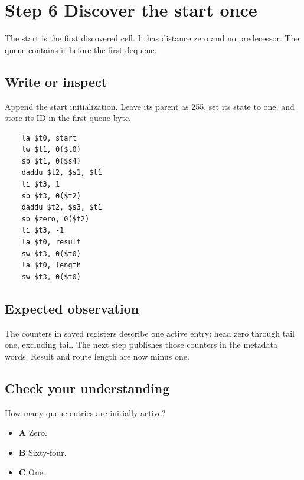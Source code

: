 \section{Step 6 Discover the start once}\label{maze-s06}

The start is the first discovered cell. It has distance zero and no predecessor. The queue contains it before the first dequeue.

\subsection{Write or inspect}

Append the start initialization. Leave its parent as 255, set its state to one, and store its ID in the first queue byte.

\begin{verbatim}
    la $t0, start
    lw $t1, 0($t0)
    sb $t1, 0($s4)
    daddu $t2, $s1, $t1
    li $t3, 1
    sb $t3, 0($t2)
    daddu $t2, $s3, $t1
    sb $zero, 0($t2)
    li $t3, -1
    la $t0, result
    sw $t3, 0($t0)
    la $t0, length
    sw $t3, 0($t0)
\end{verbatim}

\subsection{Expected observation}

The counters in saved registers describe one active entry: head zero through tail one, excluding tail. The next step publishes those counters in the metadata words. Result and route length are now minus one.

\subsection{Check your understanding}

How many queue entries are initially active?

\begin{itemize}
  \item \textbf{A} Zero.
  \item \textbf{B} Sixty-four.
  \item \textbf{C} One.
\end{itemize}
